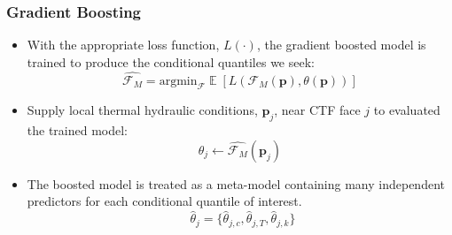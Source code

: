 \documentclass[t, pdftex]{beamer}
\DeclareMathOperator*{\E}{\mathbb{E}}
\begin{document}
\begin{frame}
\frametitle{Gradient Boosting}
\vspace{-8pt}
\begin{itemize}
    \item With the appropriate loss function, $L(\cdot)$, the gradient boosted model is trained to produce the conditional quantiles we seek:
    \[
     \hat{\mathcal F_M} =  \mathrm{argmin}_{\mathcal F}
     \E [ L(\mathcal{F}_M (\mathbf p), \theta(\mathbf p)) ]
    \]
    \item Supply local thermal hydraulic conditions, $\mathbf p_j$, near CTF face $j$ to evaluated the trained model:
    \[
    \hat \theta_j \leftarrow \hat{\mathcal F_M}(\mathbf p_j)
    \]
    \item  The boosted model is treated as a meta-model containing many independent predictors for each conditional quantile of interest.
    \[
    \ \ \hat \theta_j = \{\hat \theta_{j,c}, \hat \theta_{j,T}, \hat \theta_{j,k} \}
    \]
\end{itemize}
\cite{friedman2001}
\end{frame}

\end{document}
